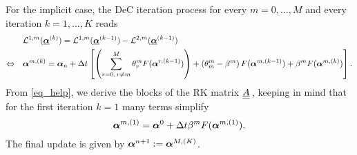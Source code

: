 For the implicit case, the DeC iteration process for every $m=0,\dots,M$ and every iteration $k=1,\dots , K$ reads
\begin{equation}\label{eq_help}
\begin{aligned}
&\mathcal{L}^{1,m}(\vec{\bc}^{(k)})=\mathcal{L}^{1,m}(\vec{\bc}^{(k-1)})-\mathcal{L}^{2,m}(\vec{\bc}^{(k-1)})\\
\Leftrightarrow  \quad &
\bc^{m,(k)}=\bc_n+\Delta t \left[\left(\sum\limits_{r=0, \,r\neq m}%
^{M}\theta_r^mF(\bc^{r,(k-1)})\right)
+\left(\theta_m^m-\beta^m\right)F(\bc^{m,(k-1)})+\beta^mF(\bc^{m,(k)})\right].
\end{aligned}
\end{equation}
From \eqref{eq_help}, we derive the blocks of the RK matrix $\mat{A}$, keeping in mind that for the first iteration $k=1$ many terms  simplify  
\begin{equation*}
\boldsymbol{\alpha}^{m,(1)}=
\boldsymbol{\alpha}^0+\Delta t \beta^mF(\boldsymbol{\alpha}^{m,(1)}).
\end{equation*}
The final update is  given by $\boldsymbol{\alpha}^{n+1}:=\boldsymbol{\alpha}^{M,(K)}$.
